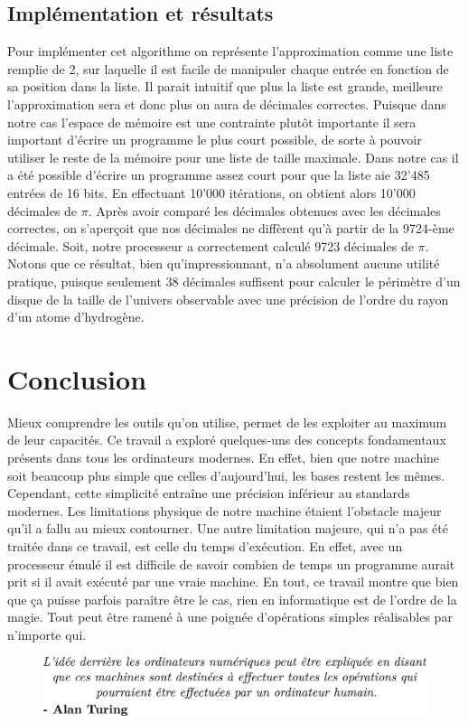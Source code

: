 \documentclass{article}
\begin{document}
\subsection{Implémentation et résultats}
Pour implémenter cet algorithme on représente l'approximation comme une liste remplie de 2, sur laquelle il est facile de manipuler chaque entrée en fonction de sa position dans la liste. Il parait intuitif que plus la liste est grande, meilleure l'approximation sera et donc plus on aura de décimales correctes. Puisque dans notre cas l'espace de mémoire est une contrainte plutôt importante il sera important d'écrire un programme le plus court possible, de sorte à pouvoir utiliser le reste de la mémoire pour une liste de taille maximale. Dans notre cas il a été possible d'écrire un programme assez court pour que la liste aie 32'485 entrées de 16 bits. En effectuant 10'000 itérations, on obtient alors 10'000 décimales de $\pi$. Après avoir comparé les décimales obtenues avec les décimales correctes, on s'aperçoit que nos décimales ne diffèrent qu'à partir de la 9724-ème décimale. Soit, notre processeur a correctement calculé 9723 décimales de $\pi$. Notons que ce résultat, bien qu'impressionnant, n'a absolument aucune utilité pratique, puisque seulement 38 décimales suffisent pour calculer le périmètre d'un disque de la taille de l'univers observable avec une précision de l'ordre du rayon d'un atome d'hydrogène. \cite{yates_2024}
\section{Conclusion}
Mieux comprendre les outils qu'on utilise, permet de les exploiter au maximum de leur capacités. Ce travail a exploré quelques-uns des concepts fondamentaux présents dans tous les ordinateurs modernes. En effet, bien que notre machine soit beaucoup plus simple que celles d'aujourd'hui, les bases restent les mêmes. Cependant, cette simplicité entraîne une précision inférieur au standards modernes. Les limitations physique de notre machine étaient l'obstacle majeur qu'il a fallu au mieux contourner. Une autre limitation majeure, qui n'a pas été traitée dans ce travail, est celle du temps d’exécution. En effet, avec un processeur émulé il est difficile de savoir combien de temps un programme aurait prit si il avait exécuté par une vraie machine. En tout, ce travail montre que bien que ça puisse parfois paraître être le cas, rien en informatique est de l'ordre de la magie. Tout peut être ramené à une poignée d'opérations simples réalisables par n'importe qui.
\vspace{5cm}
\begin{figure}[htp]
    \centering
    \includegraphics[width=12cm]{images/quote.png}
    \label{fig:quote}
\end{figure}

\newpage
\printbibliography
\end{document}
